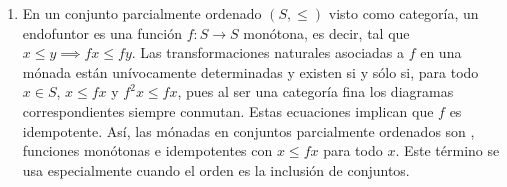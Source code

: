 \begin{example}
\begin{enumerate}
    conjunto $X$ al conjunto de funciones $s\to X\times s$ y cada función $f$ a
    $\hom(s,f\times 1_s)$. Entonces $S$ es una mónada con las transformaciones
    naturales $\eta:1\to S$ y $\mu:S^2\to S$ dadas por la formación de pares
    $\eta_X(x)(y)\coloneqq(x,y)$ y la <<doble evaluación>>
    $\mu_X(f)(y)\coloneqq (p_1fy)(p_2fy)$, donde $p_1$ y $p_2$ son las
    proyecciones canónicas de $\hom(X,s)\times s$.
  \item En un conjunto parcialmente ordenado $(S,\leq)$ visto como categoría, un
    endofuntor es una función $f:S\to S$ monótona, es decir, tal que
    $x\leq y\implies fx\leq fy$. Las transformaciones naturales asociadas a $f$
    en una mónada están unívocamente determinadas y existen si y sólo si, para
    todo $x\in S$, $x\leq fx$ y $f^2x\leq fx$, pues al ser una categoría fina
    los diagramas correspondientes siempre conmutan. Estas ecuaciones implican
    que $f$ es idempotente. Así, las mónadas en conjuntos parcialmente ordenados
    son , funciones monótonas e idempotentes con
    $x\leq fx$ para todo $x$. Este término se usa especialmente cuando el orden
    es la inclusión de conjuntos.
  \end{enumerate}
\end{example}

